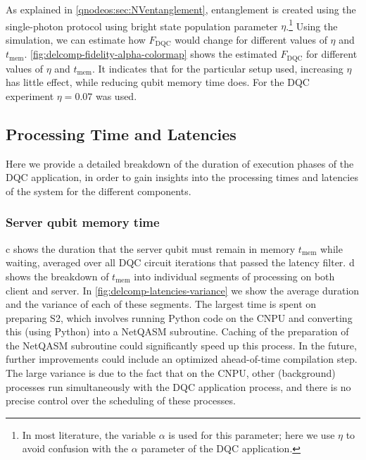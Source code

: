 As explained in \cref{qnodeos:sec:NVentanglement}, entanglement is created using the single-photon protocol using bright state population parameter $\eta$.\footnote{In most literature, the variable $\alpha$ is used for this parameter; here we use $\eta$ to avoid confusion with the $\alpha$ parameter of the \ac{DQC} application.} Using the simulation, we can estimate how $F_{\text{DQC}}$ would change for different values of $\eta$ and $t_{\text{mem}}$. \cref{fig:delcomp-fidelity-alpha-colormap} shows the estimated $F_{\text{DQC}}$ for different values of $\eta$ and $t_{\text{mem}}$. It indicates that for the particular setup used, increasing $\eta$ has little effect, while reducing qubit memory time does. For the \ac{DQC} experiment $\eta = 0.07$ was used.

\subsection{Processing Time and Latencies}
\label{qnodeos:sec:processing_time_latencies}

Here we provide a detailed breakdown of the duration of execution phases of the \ac{DQC} application, in order to gain insights into the processing times and latencies of the system for the different components.

\subsubsection{Server qubit memory time}
\label{qnodeos:sec:server-qubit-memory-time}

c shows the duration that the server qubit must remain in memory $t_{\text{mem}}$ while waiting, averaged over all \ac{DQC} circuit iterations that passed the latency filter. d shows the breakdown of $t_{\text{mem}}$ into individual segments of processing on both client and server. In \cref{fig:delcomp-latencies-variance} we show the average duration and the variance of each of these segments. The largest time is spent on preparing S2, which involves running Python code on the \ac{CNPU} and converting this (using Python) into a \ac{NetQASM} subroutine. Caching of the preparation of the \ac{NetQASM} subroutine could significantly speed up this process. In the future, further improvements could include an optimized ahead-of-time compilation step. The large variance is due to the fact that on the \ac{CNPU}, other (background) processes run simultaneously with the \ac{DQC} application process, and there is no precise control over the scheduling of these processes.

